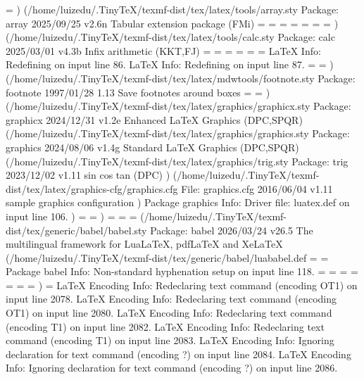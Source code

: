 \@thisrulewidth=
) (/home/luizedu/.TinyTeX/texmf-dist/tex/latex/tools/array.sty
Package: array 2025/09/25 v2.6n Tabular extension package (FMi)
\col@sep=
\ar@mcellbox=
\extrarowheight=
\NC@list=
\extratabsurround=
\backup@length=
\ar@cellbox=
) (/home/luizedu/.TinyTeX/texmf-dist/tex/latex/tools/calc.sty
Package: calc 2025/03/01 v4.3b Infix arithmetic (KKT,FJ)
\calc@Acount=
\calc@Bcount=
\calc@Adimen=
\calc@Bdimen=
\calc@Askip=
\calc@Bskip=
LaTeX Info: Redefining \setlength on input line 86.
LaTeX Info: Redefining \addtolength on input line 87.
\calc@Ccount=
\calc@Cskip=
) (/home/luizedu/.TinyTeX/texmf-dist/tex/latex/mdwtools/footnote.sty
Package: footnote 1997/01/28 1.13 Save footnotes around boxes
\fn@notes=
\fn@width=
) (/home/luizedu/.TinyTeX/texmf-dist/tex/latex/graphics/graphicx.sty
Package: graphicx 2024/12/31 v1.2e Enhanced LaTeX Graphics (DPC,SPQR)
(/home/luizedu/.TinyTeX/texmf-dist/tex/latex/graphics/graphics.sty
Package: graphics 2024/08/06 v1.4g Standard LaTeX Graphics (DPC,SPQR)
(/home/luizedu/.TinyTeX/texmf-dist/tex/latex/graphics/trig.sty
Package: trig 2023/12/02 v1.11 sin cos tan (DPC)
) (/home/luizedu/.TinyTeX/texmf-dist/tex/latex/graphics-cfg/graphics.cfg
File: graphics.cfg 2016/06/04 v1.11 sample graphics configuration
)
Package graphics Info: Driver file: luatex.def on input line 106.
)
\Gin@req@height=
\Gin@req@width=
)
\pandoc@box=
\cslhangindent=
\csllabelwidth=
(/home/luizedu/.TinyTeX/texmf-dist/tex/generic/babel/babel.sty
Package: babel 2026/03/24 v26.5 The multilingual framework for LuaLaTeX, pdfLaTeX and XeLaTeX
(/home/luizedu/.TinyTeX/texmf-dist/tex/generic/babel/luababel.def
\bbl@readstream=
\l@dumylang=
Package babel Info: Non-standard hyphenation setup on input line 118.
\l@nohyphenation=
\l@ukenglish=
\l@usenglishmax=
\l@french=
\l@portuguese=
\babelcatcodetablenum=
\bbl@pattcodes=
)
\babel@savecnt=
LaTeX Encoding Info:    Redeclaring text command \ij (encoding OT1) on input line 2078.
LaTeX Encoding Info:    Redeclaring text command \IJ (encoding OT1) on input line 2080.
LaTeX Encoding Info:    Redeclaring text command \ij (encoding T1) on input line 2082.
LaTeX Encoding Info:    Redeclaring text command \IJ (encoding T1) on input line 2083.
LaTeX Encoding Info:    Ignoring declaration for text command \ij (encoding ?) on input line 2084.
LaTeX Encoding Info:    Ignoring declaration for text command \IJ (encoding ?) on input line 2086.
